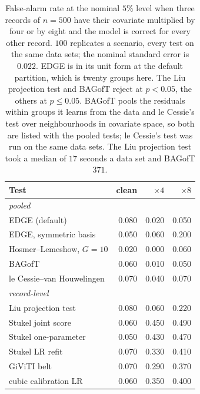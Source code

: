\begin{table}[htbp]\centering\small
\caption{False-alarm rate at the nominal $5\%$ level when three records of $n=500$ have their
covariate multiplied by four or by eight and the model is correct for every other record. $100$
replicates a scenario, every test on the same data sets; the nominal standard error is $0.022$. EDGE is
in its unit form at the default partition, which is twenty groups here. The
Liu projection test and BAGofT reject at $p<0.05$, the others at $p\le0.05$. BAGofT pools the residuals
within groups it learns from the data and le Cessie's test over neighbourhoods in covariate space, so
both are listed with the pooled tests; le Cessie's test was run on the same data sets.
 The Liu projection test took a median of $17$ seconds a data set and BAGofT $371$.}
\label{tab:rivals-contam}
\begin{tabular}{lrrr}\hline
Test & clean & $\times4$ & $\times8$ \\ \hline
\multicolumn{4}{l}{\emph{pooled}} \\
\quad EDGE (default) & 0.080 & 0.020 & 0.050 \\
\quad EDGE, symmetric basis & 0.050 & 0.060 & 0.200 \\
\quad Hosmer--Lemeshow, $G=10$ & 0.020 & 0.000 & 0.060 \\
\quad BAGofT & 0.060 & 0.010 & 0.050 \\
\quad le Cessie--van Houwelingen & 0.070 & 0.040 & 0.070 \\
\multicolumn{4}{l}{\emph{record-level}} \\
\quad Liu projection test & 0.080 & 0.060 & 0.220 \\
\quad Stukel joint score & 0.060 & 0.450 & 0.490 \\
\quad Stukel one-parameter & 0.050 & 0.430 & 0.470 \\
\quad Stukel LR refit & 0.070 & 0.330 & 0.410 \\
\quad GiViTI belt & 0.070 & 0.290 & 0.370 \\
\quad cubic calibration LR & 0.060 & 0.350 & 0.400 \\
\hline\end{tabular}\end{table}

